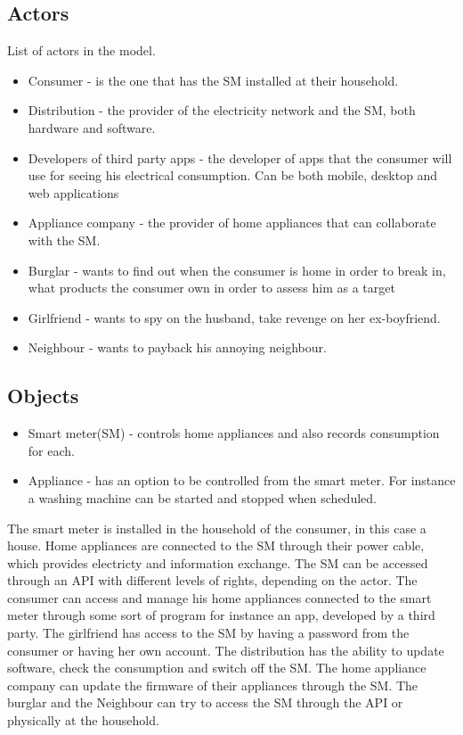 \subsection{Actors}
List of actors in the model.
\begin{itemize}
\item Consumer - is the one that has the SM installed at their household.
\item Distribution - the provider of the electricity network and the SM, both hardware and software.
\item Developers of third party apps - the developer of apps that the consumer will use for seeing his electrical consumption. Can be both mobile, desktop and web applications
\item Appliance company - the provider of home appliances that can collaborate with the SM.
\item Burglar - wants to find out when the consumer is home in order to break in, what products the consumer own in order to assess him as a target
\item Girlfriend - wants to spy on the husband, take revenge on her ex-boyfriend.
\item Neighbour - wants to payback his annoying neighbour.
\end{itemize}

\subsection{Objects}
\begin{itemize}
\item Smart meter(SM) - controls home appliances and also records consumption for each.
\item Appliance - has an option to be controlled from the smart meter. For instance a washing machine can be started and stopped when scheduled.
\end{itemize}

The smart meter is installed in the household of the consumer, in this case a house.
Home appliances are connected to the SM through their power cable, which provides electricty and information exchange.
The SM can be accessed through an API with different levels of rights, depending on the actor.
The consumer can access and manage his home appliances connected to the smart meter through some sort of program for instance an app, developed by a third party.
The girlfriend has access to the SM by having a password from the consumer or having her own account.
The distribution has the ability to update software, check the consumption and switch off the SM.
The home appliance company can update the firmware of their appliances through the SM.
The burglar and the Neighbour can try to access the SM through the API or physically at the household.

